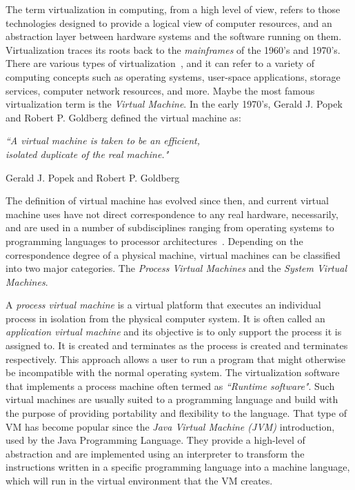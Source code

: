 The term virtualization in computing, from a high level of view, refers to those
technologies designed to provide a logical view of computer resources, and
an abstraction layer between hardware systems and the software running
on them. Virtualization traces its roots back to the \emph{mainframes} of the
1960's and 1970's. There are various types of virtualization~\cite{virt_types},
and it can refer to a variety of computing concepts such as operating systems,
user-space applications, storage services, computer network resources, and more.
Maybe the most famous virtualization term is the \emph{Virtual Machine}. In the
early 1970's, Gerald J. Popek and Robert P. Goldberg defined the virtual machine
as:
\begin{flushright}
  \emph{``A virtual machine is taken to be an efficient,\\
        isolated duplicate of the real
        machine."}~\cite{DBLP:journals/cacm/PopekG74}


  Gerald J. Popek and Robert P. Goldberg
\end{flushright}
The definition of virtual machine has evolved since then, and current virtual
machine uses have not direct correspondence to any real hardware, necessarily,
and are used in a number of subdisciplines ranging from operating systems to
programming languages to processor architectures~\cite{smith_nair}. Depending on
the correspondence degree of a physical machine, virtual machines can be
classified into two major categories. The \emph{Process Virtual Machines} and
the \emph{System Virtual Machines}.

A \emph{process virtual machine} is a virtual platform that executes an
individual process in isolation from the physical computer system. It is often
called an \emph{application virtual machine} and its objective is to only
support the process it is assigned to. It is created and terminates as the
process is created and terminates respectively. This approach allows a user to
run a program that might otherwise be incompatible with the normal operating
system. The virtualization software that implements a process machine often
termed as \emph{``Runtime software"}. Such virtual machines are usually suited
to a programming language and build with the purpose of providing portability
and flexibility to the language. That type of VM has become popular since the
\emph{Java Virtual Machine (JVM)} introduction, used by the Java Programming
Language. They provide a high-level of abstraction and are implemented using an
interpreter to transform the instructions written in a specific programming
language into a machine language, which will run in the virtual environment
that the VM creates.

